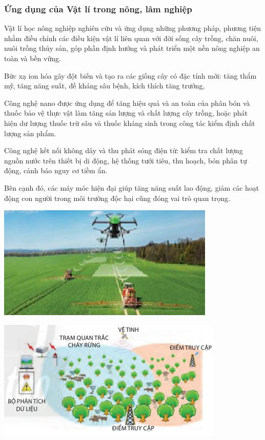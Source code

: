 \subsubsection{Ứng dụng của Vật lí trong nông, lâm nghiệp}
\begin{minipage}[l]{0.6\textwidth}
Vật lí học nông nghiệp nghiên cứu và ứng dụng những phương pháp, phương tiện nhằm điều chỉnh các điều kiện vật lí liên quan với đời sống cây trồng, chăn nuôi, nuôi trồng thủy sản, góp phần định hướng và phát triển một nền nông nghiệp an toàn và bền vững.

Bức xạ ion hóa gây đột biến và tạo ra các giống cây có đặc tính mới: tăng thẩm mỹ, tăng năng suất, đề kháng sâu bệnh, kích thích tăng trưởng,

Công nghệ nano được ứng dụng để tăng hiệu quả và an toàn của phân bón và thuốc bảo vệ thực vật làm tăng sản lượng và chất lượng cây trồng, hoặc phát hiện dư lượng thuốc trừ sâu và thuốc kháng sinh trong công tác kiểm định chất lượng sản phẩm.

Công nghệ kết nối không dây và thu phát sóng điện từ: kiểm tra chất lượng nguồn nước trên thiết bị di động, hệ thống tưới tiêu, thu hoạch, bón phân tự động, cảnh báo nguy cơ tiềm ẩn.

Bên cạnh đó, các máy móc hiện đại giúp tăng năng suất lao động, giảm các hoạt động con người trong môi trường độc hại cũng đóng vai trò quan trọng.
\end{minipage}
\begin{minipage}[r]{0.4\textwidth}
\begin{center}
	\includegraphics[scale=0.8]{../figs/G10-003-3.png}
\end{center}
\begin{center}
	\includegraphics[scale=0.8]{../figs/G10-003-4.png}
\end{center}
\end{minipage}
